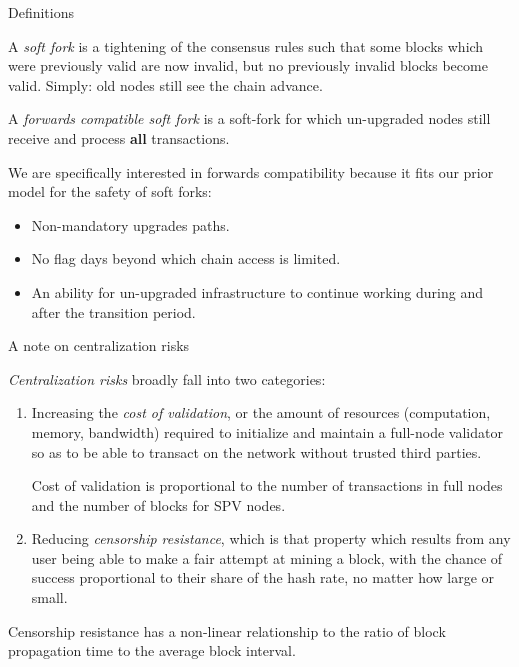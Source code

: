 \documentclass[10pt]{beamer}
\begin{document}
\begin{frame}{Definitions}

  A \emph{soft fork} is a tightening of the consensus rules such that
  some blocks which were previously valid are now invalid, but no
  previously invalid blocks become valid. Simply: old nodes still
  see the chain advance.

  A \emph{forwards compatible soft fork} is a soft-fork for which
  un-upgraded nodes still receive and process \textbf{all}
  transactions.

  We are specifically interested in forwards compatibility because it
  fits our prior model for the safety of soft forks:

  \begin{itemize}

  \item Non-mandatory upgrades paths.

  \item No flag days beyond which chain access is limited.

  \item An ability for un-upgraded infrastructure to continue working
    during and after the transition period.

  \end{itemize}

\end{frame}

\begin{frame}{A note on centralization risks}

  \emph{Centralization risks} broadly fall into two categories:

  \begin{enumerate}

  \item Increasing the \emph{cost of validation}, or the amount of
    resources (computation, memory, bandwidth) required to initialize
    and maintain a full-node validator so as to be able to transact on
    the network without trusted third parties.


  Cost of validation is proportional to the number of transactions in
  full nodes and the number of blocks for SPV nodes.


  \item Reducing \emph{censorship resistance}, which is that property
    which results from any user being able to make a fair attempt at
    mining a block, with the chance of success proportional to their
    share of the hash rate, no matter how large or small.

  \end{enumerate}

  Censorship resistance has a non-linear relationship to the ratio of
  block propagation time to the average block interval.

\end{frame}
\end{document}
